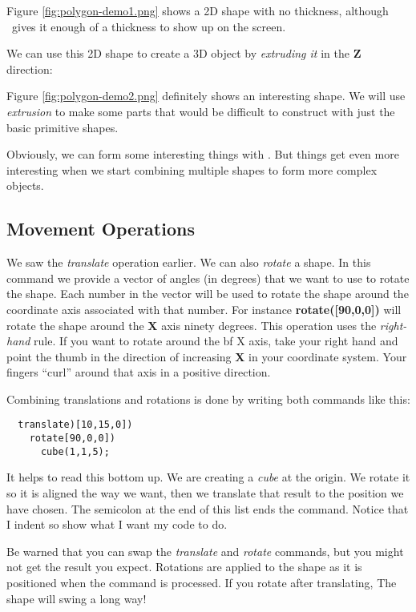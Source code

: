 Figure \ref{fig:polygon-demo1.png} shows a  2D shape with no thickness, although
\osc\ gives it enough of a thickness to show up on the screen.

We can use this 2D shape to create a 3D object by {\it extruding it} in the
{\bf Z} direction:


Figure \ref{fig:polygon-demo2.png} definitely shows an interesting shape. We
will use {\it extrusion} to make some parts that would be difficult to construct
with just the basic primitive shapes.


Obviously, we can form some interesting things with \osc. But things get
even more interesting when we start combining multiple shapes to form more
complex objects.

\subsection*{Movement Operations}

We saw the {\it translate} operation earlier. We can also {\it rotate} a shape.
In this command we provide a vector of angles (in degrees) that we want to use
to rotate the shape. Each number in the vector will be used to rotate the shape
around the coordinate axis associated with that number. For instance {\bf
rotate([90,0,0])} will rotate the shape around the {\bf X} axis ninety degrees.
This operation uses the {\it right-hand} rule. If you want to rotate around the
{bf X} axis, take your right hand and point the thumb in the direction of
increasing {\bf X} in your coordinate system. Your fingers ``curl'' around that
axis in a positive direction.

Combining translations and rotations is done by writing both commands like
this:

\begin{lstlisting}
  translate)[10,15,0])
    rotate[90,0,0])
      cube(1,1,5);
\end{lstlisting}

It helps to read this bottom up. We are creating a {\it cube} at the origin. We
rotate it so it is aligned the way we want, then we translate that result to
the position we have chosen. The semicolon at the end of this list ends the
command. Notice that I indent so show what I want my code to do.

Be warned that you can swap the {\it translate} and {\it rotate} commands, but
you might not get the result you expect. Rotations are applied to the shape as
it is positioned when the command is processed. If you rotate after
translating, The shape will swing a long way!

